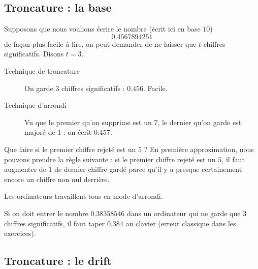 \subsection{Troncature : la base}

Supposons que nous voulions écrire le nombre (écrit ici en base \( 10\))
\begin{equation}
	0.4567894251
\end{equation}
de façon plus facile à lire, on peut demander de ne laisser que \( t\) chiffres significatifs. Disons \( t=3\).

\begin{description}
	\item[Technique de troncature] On garde \( 3\) chiffres significatifs : \( 0.456\). Facile.
	\item[Technique d'arrondi] Vu que le premier qu'on supprime est un \( 7\), le dernier qu'on garde est majoré de \( 1\) : on écrit \( 0.457\).
\end{description}

Que faire si le premier chiffre rejeté est un \( 5\) ? En première approximation, nous pouvons prendre la règle suivante : si le premier chiffre rejeté est un \( 5\), il faut augmenter de \( 1\) de dernier chiffre gardé parce qu'il y a presque certainement encore un chiffre non nul derrière.

\begin{remark}
	Les ordinateurs travaillent tous en mode d'arrondi.
\end{remark}

\begin{example}
    Si on doit entrer le nombre \( 0.38358546\) dans un ordinateur qui ne garde que \( 3\) chiffres significatifs, il faut taper \( 0.384\) au clavier (erreur classique dans les exercices).
\end{example}

\subsection{Troncature : le drift}

